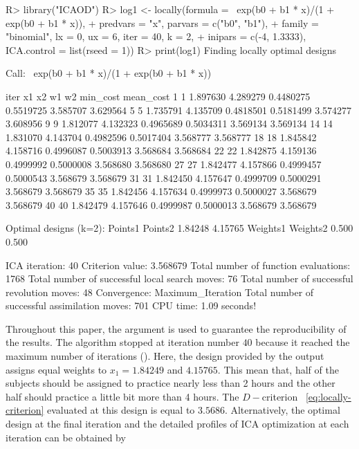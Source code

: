 \begin{example}
R> library("ICAOD")
R> log1 <- locally(formula = ~exp(b0 + b1 * x)/(1 + exp(b0 + b1 * x)),
+                 predvars = "x", parvars = c("b0", "b1"),
+                 family = "binomial", lx = 0, ux = 6, iter = 40, k = 2,
+                 inipars = c(-4, 1.3333), ICA.control = list(rseed = 1))
R> print(log1)
Finding  locally optimal designs

Call:
  ~exp(b0 + b1 * x)/(1 + exp(b0 + b1 * x))

iter       x1       x2        w1        w2 min_cost mean_cost
1     1 1.897630 4.289279 0.4480275 0.5519725 3.585707  3.629564
5     5 1.735791 4.135709 0.4818501 0.5181499 3.574277  3.608956
9     9 1.812077 4.132323 0.4965689 0.5034311 3.569134  3.569134
14   14 1.831070 4.143704 0.4982596 0.5017404 3.568777  3.568777
18   18 1.845842 4.158716 0.4996087 0.5003913 3.568684  3.568684
22   22 1.842875 4.159136 0.4999992 0.5000008 3.568680  3.568680
27   27 1.842477 4.157866 0.4999457 0.5000543 3.568679  3.568679
31   31 1.842450 4.157647 0.4999709 0.5000291 3.568679  3.568679
35   35 1.842456 4.157634 0.4999973 0.5000027 3.568679  3.568679
40   40 1.842479 4.157646 0.4999987 0.5000013 3.568679  3.568679

Optimal designs (k=2):
  Points1 Points2
1.84248 4.15765
Weights1 Weights2
0.500   0.500

ICA iteration: 40
Criterion value:  3.568679
Total number of function evaluations: 1768
Total number of successful local search moves: 76
Total number of successful revolution moves: 48
Convergence: Maximum_Iteration
Total number of successful assimilation moves: 701
CPU time: 1.09  seconds!
  \end{example}
Throughout this paper, the  argument is used to guarantee the reproducibility of the results.
The algorithm stopped at iteration number $40$ because it reached  the  maximum number of iterations ().
Here, the design provided by the output assigns equal weights to $x_1 =  1.84249$ and $4.15765$. This mean that, half of the subjects should be assigned to  practice nearly less than 2 hours and the other half should   practice a little bit more than 4 hours.
The $D-$criterion ~\eqref{eq:locally-criterion}  evaluated at  this design  is equal to $3.5686$. Alternatively, the optimal design at the final iteration and the detailed profiles of ICA optimization at each iteration can be obtained by
